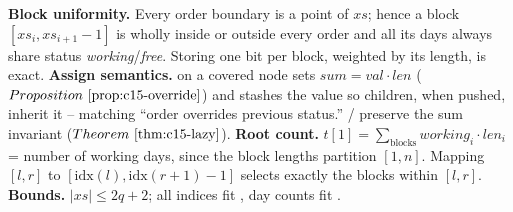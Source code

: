 \begin{proofbox}
\textbf{Block uniformity.} Every order boundary is a point of \(xs\); hence a block \([xs_i,xs_{i+1}-1]\) is wholly inside or outside every order and all its days always share status \emph{working}/\emph{free}.  Storing one bit per block, weighted by its length, is exact.
\textbf{Assign semantics.}  on a covered node sets \(\mathit{sum}=\mathit{val}\cdot\mathit{len}\) (\(\propref{c15-override}\)) and stashes the value so children, when pushed, inherit it -- matching ``order overrides previous status.''  / preserve the sum invariant (\(\thmref{c15-lazy}\)).
\textbf{Root count.} \(t[1]=\sum_{\text{blocks}} \mathit{working}_i\cdot\mathit{len}_i\) = number of working days, since the block lengths partition \([1,n]\).  Mapping \([l,r]\) to \([\mathrm{idx}(l),\mathrm{idx}(r{+}1)-1]\) selects exactly the blocks within \([l,r]\).  \textbf{Bounds.} \(|xs|\le 2q+2\); all indices fit , day counts fit .
\end{proofbox}

